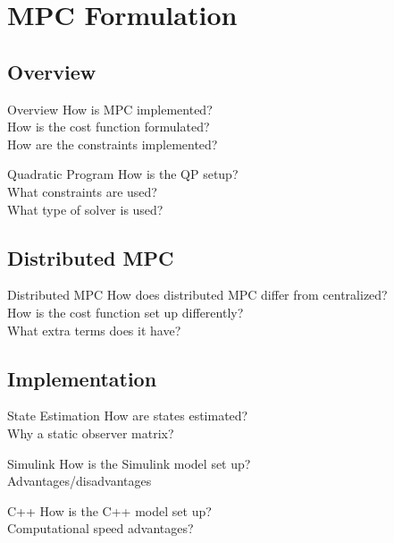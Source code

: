 \section{MPC Formulation}

\subsection{Overview}
\begin{frame}{Overview}
  How is MPC implemented?\\
  How is the cost function formulated?\\
  How are the constraints implemented?
\end{frame}

\begin{frame}{Quadratic Program}
  How is the QP setup?\\
  What constraints are used?\\
  What type of solver is used?
\end{frame}

\subsection{Distributed MPC}
\begin{frame}{Distributed MPC}
  How does distributed MPC differ from centralized?\\
  How is the cost function set up differently?\\
  What extra terms does it have?
\end{frame}

\subsection{Implementation}
\begin{frame}{State Estimation}
  How are states estimated?\\
  Why a static observer matrix?
\end{frame}

\begin{frame}{Simulink}
  How is the Simulink model set up?\\
  Advantages/disadvantages
\end{frame}

\begin{frame}{C++}
  How is the C++ model set up?\\
  Computational speed advantages?
\end{frame}

